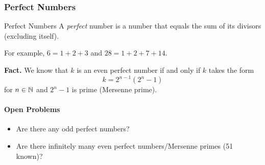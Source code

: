 \documentclass[class=article, crop=false]{standalone}
\begin{document}
  \subsubsection{Perfect Numbers}
  \begin{definition}{Perfect Numbers}
    A \emph{perfect} number is a number that equals the sum of its divisors (excluding itself).
  \end{definition}
  For example, $6 = 1 + 2 + 3$ and $28 = 1 + 2 + 7 + 14$. \par
  \textbf{Fact.} We know that $k$ is an even perfect number if and only if $k$ takes the form
  \[
    k = 2^{n - 1}(2^n - 1)
  \]
  for $n\in \mathbb{N}$ and $2^n - 1$ is prime (Mersenne prime).
  \paragraph{Open Problems}
  \begin{itemize}
    \item Are there any odd perfect numbers?
    \item Are there infinitely many even perfect numbers/Mersenne primes (51 known)?
  \end{itemize}
\end{document}
